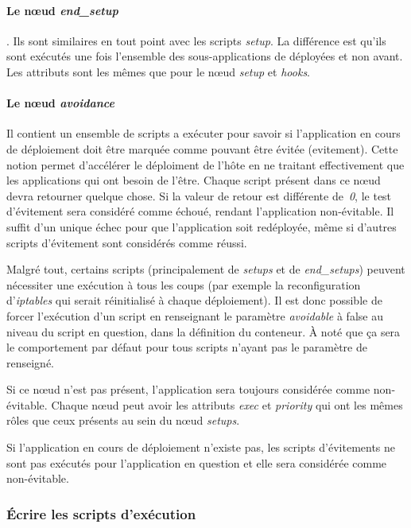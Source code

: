 \paragraph{Le nœud \emph{end\_setup}}. Ils sont similaires en tout point avec les scripts \emph{setup}. La différence est qu'ils sont exécutés une fois l'ensemble des sous-applications de déployées et non avant.
Les attributs sont les mêmes que pour le nœud \emph{setup} et \emph{hooks}.

\paragraph{Le nœud \emph{avoidance}}
Il contient un ensemble de scripts a exécuter pour savoir si l'application en cours de déploiement doit être marquée comme pouvant être évitée (\gls{evitement}).
Cette notion permet d'accélérer le déploiment de l'hôte en ne traitant effectivement que les applications qui ont besoin de l'être.
Chaque script présent dans ce nœud devra retourner quelque chose. Si la valeur de retour est différente de~\emph{0}, le test d'évitement sera considéré comme échoué, rendant l'application non-évitable.
Il suffit d'un unique échec pour que l'application soit redéployée, même si d'autres scripts d'évitement sont considérés comme réussi.

Malgré tout, certains scripts (principalement de \emph{setups} et de \emph{end\_setups}) peuvent nécessiter une exécution à tous les coups (par exemple la reconfiguration d'\emph{iptables} qui serait réinitialisé à chaque déploiement).
Il est donc possible de forcer l'exécution d'un script en renseignant le paramètre \emph{avoidable} à {false} au niveau du script en question, dans la définition du conteneur.
À noté que ça sera le comportement par défaut pour tous scripts n'ayant pas le paramètre de renseigné.

Si ce nœud n'est pas présent, l'application sera toujours considérée comme non-évitable. Chaque nœud peut avoir les attributs \emph{exec} et \emph{priority} qui ont les mêmes rôles que ceux présents au sein du nœud \emph{setups}.

Si l'application en cours de déploiement n'existe pas, les scripts d'évitements ne sont pas exécutés pour l'application en question et elle sera considérée comme non-évitable.

\subsubsection{Écrire les scripts d'exécution}

